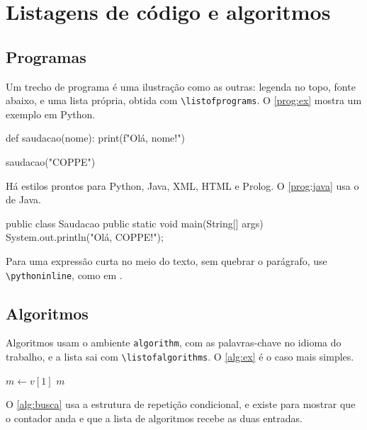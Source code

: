 \documentclass[dsc]{ufrj}
\begin{document}
  \chapter{Listagens de código e algoritmos}

  \section{Programas}

  Um trecho de programa é uma ilustração como as outras: legenda no topo, fonte
  abaixo, e uma lista própria, obtida com \verb|\listofprograms|. O
  \autoref{prog:ex} mostra um exemplo em Python.

  \begin{python}[caption={Olá, COPPE, em Python},label=prog:ex]
def saudacao(nome):
    print(f"Olá, {nome}!")

saudacao("COPPE")
  \end{python}

  Há estilos prontos para Python, Java, XML, HTML e Prolog. O \autoref{prog:java}
  usa o de Java.

  \begin{java}[caption={O mesmo programa em Java},label=prog:java]
public class Saudacao {
    public static void main(String[] args) {
        System.out.println("Olá, COPPE!");
    }
}
  \end{java}

  Para uma expressão curta no meio do texto, sem quebrar o parágrafo, use
  \verb|\pythoninline|, como em .

  \section{Algoritmos}

  Algoritmos usam o ambiente \verb|algorithm|, com as palavras-chave no idioma do
  trabalho, e a lista sai com \verb|\listofalgorithms|. O \autoref{alg:ex} é o
  caso mais simples.

  \begin{algorithm}[H]
    \caption{Máximo de um vetor}
    \label{alg:ex}
    $m \leftarrow v[1]$\;
    \KwRet $m$\;
  \end{algorithm}

  O \autoref{alg:busca} usa a estrutura de repetição condicional, e existe para
  mostrar que o contador anda e que a lista de algoritmos recebe as duas
  entradas.
\end{document}
